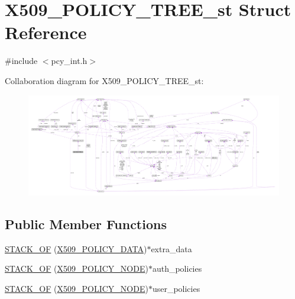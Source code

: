 \hypertarget{struct_x509___p_o_l_i_c_y___t_r_e_e__st}{}\section{X509\+\_\+\+P\+O\+L\+I\+C\+Y\+\_\+\+T\+R\+E\+E\+\_\+st Struct Reference}
\label{struct_x509___p_o_l_i_c_y___t_r_e_e__st}


{\ttfamily \#include $<$pcy\+\_\+int.\+h$>$}



Collaboration diagram for X509\+\_\+\+P\+O\+L\+I\+C\+Y\+\_\+\+T\+R\+E\+E\+\_\+st\+:\nopagebreak
\begin{figure}[H]
\begin{center}
\leavevmode
\includegraphics[width=350pt]{struct_x509___p_o_l_i_c_y___t_r_e_e__st__coll__graph}
\end{center}
\end{figure}
\subsection*{Public Member Functions}
\begin{DoxyCompactItemize}
\item 
\hyperlink{struct_x509___p_o_l_i_c_y___t_r_e_e__st_a69b4ed285ad5af60972113809e550ec1}{S\+T\+A\+C\+K\+\_\+\+OF} (\hyperlink{pcy__int_8h_a0a96e7c084ee8bfa265612987136abd0}{X509\+\_\+\+P\+O\+L\+I\+C\+Y\+\_\+\+D\+A\+TA})$\ast$extra\+\_\+data
\item 
\hyperlink{struct_x509___p_o_l_i_c_y___t_r_e_e__st_a73269fa4615bd11ca4eb9caf8ecc5fb9}{S\+T\+A\+C\+K\+\_\+\+OF} (\hyperlink{crypto_2ossl__typ_8h_a4fbb35756a73b47a3c4c86b5a6869f4d}{X509\+\_\+\+P\+O\+L\+I\+C\+Y\+\_\+\+N\+O\+DE})$\ast$auth\+\_\+policies
\item 
\hyperlink{struct_x509___p_o_l_i_c_y___t_r_e_e__st_a99624e882792ca9ef428ecadcad460bf}{S\+T\+A\+C\+K\+\_\+\+OF} (\hyperlink{crypto_2ossl__typ_8h_a4fbb35756a73b47a3c4c86b5a6869f4d}{X509\+\_\+\+P\+O\+L\+I\+C\+Y\+\_\+\+N\+O\+DE})$\ast$user\+\_\+policies
\end{DoxyCompactItemize}
